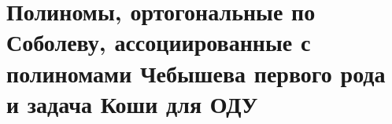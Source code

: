 \chapter{Полиномы, ортогональные по Соболеву, ассоциированные с полиномами Чебышева первого рода и задача Коши для ОДУ }









